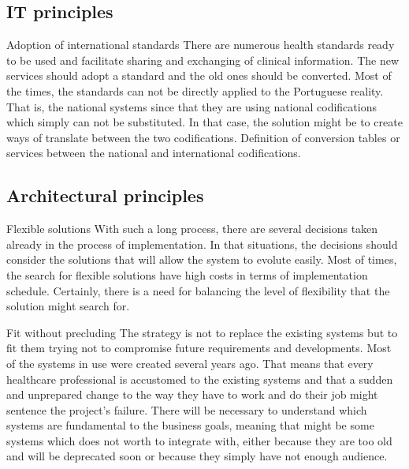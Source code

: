 \subsection{IT principles}

{Adoption of international standards} %
{There are numerous health standards ready to be used and facilitate sharing and exchanging of clinical information. The new services should adopt a standard and the old ones should be converted.} %
{Most of the times, the standards can not be directly applied to the Portuguese reality. That is, the national systems since that they are using national codifications which simply can not be substituted. In that case, the solution might be to create ways of translate between the two codifications. } %
{Definition of conversion tables or services between the national and international codifications.} %

\subsection{Architectural principles}

{Flexible solutions}
{With such a long process, there are several decisions taken already in the process of implementation. In that situations, the decisions should consider the solutions that will allow the system to evolute easily.} %
{Most of times, the search for flexible solutions have high costs in terms of implementation schedule. Certainly, there is a need for balancing the level of flexibility that the solution might search for. } %
{} %

{Fit without precluding}
{The strategy is not to replace the existing systems but to fit them trying not to compromise future requirements and developments.}
{Most of the systems in use were created several years ago. That means that every healthcare professional is accustomed to the existing systems and that a sudden and unprepared change to the way they have to work and do their job might sentence the project's failure.}
{There will be necessary to understand which systems are fundamental to the business goals, meaning that might be some systems which does not worth to integrate with, either because they are too old and will be deprecated soon or because they simply have not enough audience.}



